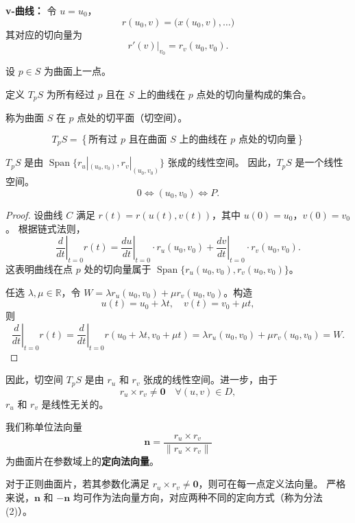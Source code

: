 \documentclass[lang=cn,10pt,thmcnt=section]{elegantbook}
\begin{document}
    \textbf{v-曲线：} 令 $u = u_0$，
    $$
    r(u_0, v) = \big(x(u_0, v), \ldots \big)
    $$
    其对应的切向量为
    $$
    \left. r'(v) \right|_{v_0} = r_v(u_0, v_0).
    $$
    \begin{definition}[切平面]
        设 $p \in S$ 为曲面上一点。
        
        定义 $T_p S$ 为所有经过 $p$ 且在 $S$ 上的曲线在 $p$ 点处的切向量构成的集合。
        
        称为曲面 $S$ 在 $p$ 点处的切平面（切空间）。
        
        $$
        T_p S = \left\{ \text{所有过 } p \text{ 且在曲面 } S \text{ 上的曲线在 } p \text{ 点处的切向量} \right\}
        $$
\end{definition}
\begin{proposition}
    $T_p S$ 是由 $\operatorname{Span}\{ r_u|_{(u_0,v_0)}, r_v|_{(u_0,v_0)} \}$ 张成的线性空间。  
因此，$T_p S$ 是一个线性空间。  
\[ 0 \iff (u_0, v_0) \iff P. \]
\end{proposition}
\begin{proof}
    设曲线 $C$ 满足 $r(t) = r(u(t), v(t))$，其中 $u(0) = u_0$，$v(0) = v_0$。  
根据链式法则，  
\[
\left. \frac{d}{dt} \right|_{t=0} r(t) = \left. \frac{du}{dt} \right|_{t=0} \cdot r_u(u_0, v_0) + \left. \frac{dv}{dt} \right|_{t=0} \cdot r_v(u_0, v_0).
\]  
这表明曲线在点 $p$ 处的切向量属于 $\operatorname{Span}\{ r_u(u_0, v_0), r_v(u_0, v_0) \}$。

任选 $\lambda, \mu \in \mathbb{R}$，令 $W = \lambda r_u(u_0, v_0) + \mu r_v(u_0, v_0)$。构造  
\[ u(t) = u_0 + \lambda t, \quad v(t) = v_0 + \mu t, \]  
则  
\[
\left. \frac{d}{dt} \right|_{t=0} r(t) = \left. \frac{d}{dt} \right|_{t=0} r(u_0 + \lambda t, v_0 + \mu t) = \lambda r_u(u_0, v_0) + \mu r_v(u_0, v_0) = W.
\]  
\end{proof}
\begin{remark}
    因此，切空间 $T_p S$ 是由 $r_u$ 和 $r_v$ 张成的线性空间。进一步，由于  
\[ r_u \times r_v \neq \mathbf{0} \quad \forall (u, v) \in D, \]  
$r_u$ 和 $r_v$ 是线性无关的。
\end{remark}
\begin{definition}[法向量与正则曲面片]
    我们称单位法向量
\[
\mathbf{n} = \frac{r_u \times r_v}{\lVert r_u \times r_v \rVert}
\]
为曲面片在参数域上的\textbf{定向法向量}。

对于正则曲面片，若其参数化满足 $r_u \times r_v \neq \mathbf{0}$，则可在每一点定义法向量。  
严格来说，$\mathbf{n}$ 和 $-\mathbf{n}$ 均可作为法向量方向，对应两种不同的定向方式（称为分法 (2)）。
\end{definition}
\end{document}
